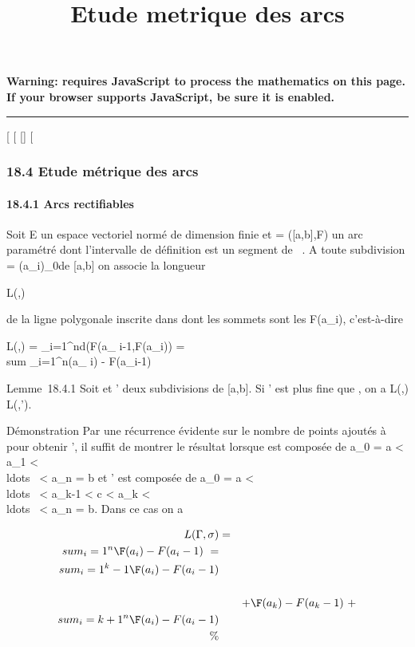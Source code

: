 \documentclass[]{article}
\title{Etude metrique des arcs}
\author{}
\date{}
\begin{document}
\maketitle

\textbf{Warning: 
requires JavaScript to process the mathematics on this page.\\ If your
browser supports JavaScript, be sure it is enabled.}

\begin{center}\rule{3in}{0.4pt}\end{center}

[
[
[]
[

\subsubsection{18.4 Etude métrique des arcs}

\paragraph{18.4.1 Arcs rectifiables}

Soit E un espace vectoriel normé de dimension finie et \Gamma = ([a,b],F)
un arc paramétré dont l'intervalle de définition est un segment de ~. A
toute subdivision \sigma = (a_i)_0\leqi\leqn de [a,b] on
associe la longueur

L(\Gamma,\sigma)

de la ligne polygonale inscrite dans \Gamma dont les sommets sont les
F(a_i), c'est-à-dire

L(\Gamma,\sigma) = \sum _i=1^nd(F(a_
i-1,F(a_i)) = \\sum
_i=1^n\F(a_ i) -
F(a_i-1)\

Lemme~18.4.1 Soit \sigma et \sigma' deux subdivisions de [a,b]. Si \sigma' est plus
fine que \sigma, on a L(\Gamma,\sigma) \leq L(\Gamma,\sigma').

Démonstration Par une récurrence évidente sur le nombre de points
ajoutés à \sigma pour obtenir \sigma', il suffit de montrer le résultat lorsque \sigma
est composée de a_0 = a < a_1 <
\\ldots~ <
a_n = b et \sigma' est composée de a_0 = a <
\\ldots~ <
a_k-1 < c < a_k <
\\ldots~ <
a_n = b. Dans ce cas on a

\begin{align*} L(\Gamma,\sigma)& =&
\\sum
_i=1^n\F(a_ i) -
F(a_i-1)\ =
\\sum
_i=1^k-1\F(a_ i) -
F(a_i-1)\\%
\\ & &
+\F(a_k) -
F(a_k-1)\ +
\\sum
_i=k+1^n\F(a_ i) -
F(a_i-1)\\ \%&
\\ \end{align*}
\end{document}
